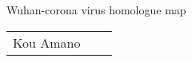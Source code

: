 \documentclass[portrait,a0,oldgerm]{a0poster}
\def\areaspace{9.4mm}
\begin{document}

\begin{center}
\vspace{25mm}
\end{center}
\begin{center}
\color[cmyk]{0,1,1,0.9}
\linespread{5.0}\fontsize{90}{20}\selectfont
Wuhan-corona virus homologue map
\end{center}
\vspace{20mm}
\color[cmyk]{0,1,1,0.85}
\linespread{1.4}\fontsize{50}{20}\selectfont
\begin{center} \begin{tabular}[t]{ccc}
Kou Amano \\
\end{tabular} \end{center}
\color[cmyk]{0,1,1,0.82}
\linespread{1.4}\fontsize{48}{20}\selectfont
\begin{center} \begin{tabular}{c} 
\end{tabular} \end{center}
\vspace{25mm}


\vspace{25mm}
\color[cmyk]{1,1,0,0.8}

\end{document}

